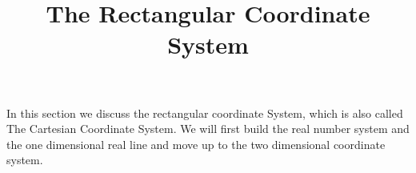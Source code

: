 \documentclass{ximera}
\title{The Rectangular Coordinate System}
\begin{document}
	\begin{abstract}
	\end{abstract}
	\maketitle
	
	
		In this section we discuss the rectangular coordinate System, which is also called The Cartesian Coordinate System. We will first build the real number system and the one dimensional real line and move up to the two dimensional coordinate system.
\end{document}
